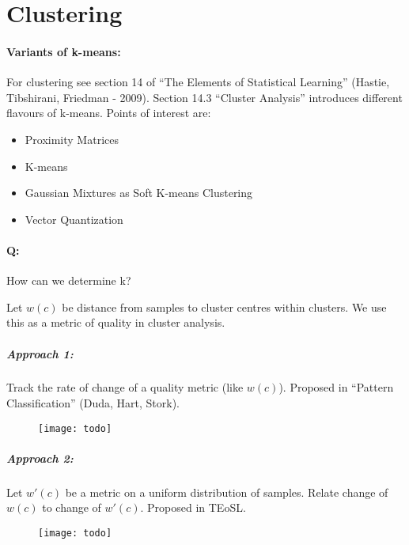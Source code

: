 
\section{Clustering}

\paragraph{Variants of k-means:}
For clustering see section 14 of ``The Elements of Statistical Learning'' (Hastie, Tibshirani, Friedman - 2009). Section 14.3 ``Cluster Analysis'' introduces different flavours of k-means. Points of interest are:
\begin{itemize}
	\item Proximity Matrices
	\item K-means
	\item Gaussian Mixtures as Soft K-means Clustering
	\item Vector Quantization
\end{itemize}

\paragraph{Q:} How can we determine k?

Let $w(c)$ be distance from samples to cluster centres within clusters. We use this as a metric of quality in cluster analysis.

\subparagraph{Approach 1:} Track the rate of change of a quality metric (like $w(c)$). Proposed in ``Pattern Classification'' (Duda, Hart, Stork).

\begin{figure}[H]
	\centering
	\texttt{[image: todo]}
\end{figure}

\subparagraph{Approach 2:} Let $w'(c)$ be a metric on a uniform distribution of samples. Relate change of $w(c)$ to change of $w'(c)$. Proposed in TEoSL.

\begin{figure}[H]
	\centering
	\texttt{[image: todo]}
\end{figure}